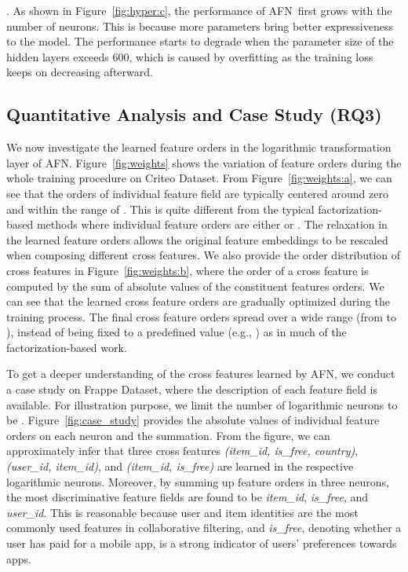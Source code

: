 \documentclass[letterpaper]{article} \usepackage{aaai20}  \usepackage{times}  \usepackage{helvet} \usepackage{courier}  \usepackage[hyphens]{url}  \usepackage{graphicx} \urlstyle{rm} \def\UrlFont{\rm}  \usepackage{graphicx}  \frenchspacing  \setlength{\pdfpagewidth}{8.5in}  \setlength{\pdfpageheight}{11in}
\newcommand{\model}{{AFN}~}
\newcommand{\modelns}{{AFN}}
\begin{document}
.
As shown in Figure~\ref{fig:hyper:c}, the performance of \model first grows with the number of neurons. This is because more parameters bring better expressiveness to the model. The performance starts to degrade when the parameter size of the hidden layers exceeds 600, which is caused by overfitting as the training loss keeps on decreasing afterward.

\subsection{Quantitative Analysis and Case Study (RQ3)}


We now investigate the learned feature orders in the logarithmic transformation layer of \modelns. Figure~\ref{fig:weights} shows the variation of feature orders during the whole training procedure on Criteo Dataset. From Figure~\ref{fig:weights:a}, we can see that the orders of individual feature field are typically centered around zero and within the range of . This is quite different from the typical factorization-based methods where individual feature orders are either  or . The relaxation in the learned feature orders allows the original feature embeddings to be rescaled when composing different cross features. 
We also provide the order distribution of cross features in Figure~\ref{fig:weights:b}, where the order of a cross feature is computed by the sum of absolute values of the constituent features orders. We can see that the learned cross feature orders are gradually optimized during the training process. The final cross feature orders spread over a wide range (from  to ), instead of being fixed to a predefined value (e.g., ) as in much of the factorization-based work.

To get a deeper understanding of the cross features learned by \modelns, we conduct a case study on Frappe Dataset, where the description of each feature field is available. For illustration purpose, we limit the number of logarithmic neurons to be . Figure~\ref{fig:case_study} provides the absolute values of individual feature orders on each neuron and the summation. From the figure, we can approximately infer that three cross features \emph{(item\_id, is\_free, country)}, \emph{(user\_id, item\_id)}, and \emph{(item\_id, is\_free)} are learned in the respective logarithmic neurons. Moreover, by summing up feature orders in three neurons, the most discriminative feature fields are found to be \emph{item\_id}, \emph{is\_free}, and \emph{user\_id}. This is reasonable because user and item identities are the most commonly used features in collaborative filtering, and \emph{is\_free}, denoting whether a user has paid for a mobile app, is a strong indicator of users' preferences towards apps.
 
\end{document}
